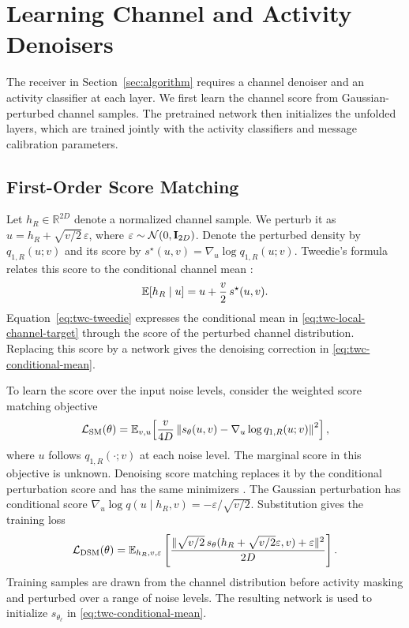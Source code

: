 \section{Learning Channel and Activity Denoisers}
\label{sec:learning}

The receiver in Section~\ref{sec:algorithm} requires a channel denoiser
and an activity classifier at each layer. We first learn the channel
score from Gaussian-perturbed channel samples. The pretrained network
then initializes the unfolded layers, which are trained jointly with
the activity classifiers and message calibration parameters.

\subsection{First-Order Score Matching}

Let $h_R\in\mathbb R^{2D}$ denote a normalized channel sample.
We perturb it as $u=h_R+\sqrt{v/2}\,\varepsilon$, where
$\varepsilon\sim\mathcal N(0,\mathbf{I}_{2D})$. Denote the perturbed
density by $q_{1,R}(u;v)$ and its score by
$s^\star(u,v)=\nabla_u\log q_{1,R}(u;v)$.
Tweedie's formula relates this score to the conditional channel mean
\cite{efron2011,cai2026}:
\begin{equation}
 \mathbb{E}[h_R\mid u]=u+\frac v2\,s^\star(u,v).
 \label{eq:twc-tweedie}
\end{equation}
Equation~\eqref{eq:twc-tweedie} expresses the conditional mean in
\eqref{eq:twc-local-channel-target} through the score of the perturbed
channel distribution. Replacing this score by a network gives the
denoising correction in \eqref{eq:twc-conditional-mean}.

To learn the score over the input noise levels, consider the
weighted score matching objective \cite[eqs.~(46)--(49)]{cai2026}
\begin{equation}
 \mathcal L_{\rm SM}(\theta)
 =\mathbb{E}_{v,u}\!\left[
 \frac{v}{4D}\left\|s_\theta(u,v)
       -\nabla_u\log q_{1,R}(u;v)\right\|^2\right],
 \label{eq:twc-score-matching}
\end{equation}
where $u$ follows $q_{1,R}(\cdot;v)$ at each noise level.
The marginal score in this objective is unknown. Denoising score
matching replaces it by the conditional perturbation score and has
the same minimizers \cite{vincent2011,song2019}.
The Gaussian perturbation has conditional score
$\nabla_u\log q(u\mid h_R,v)=-\varepsilon/\sqrt{v/2}$.
Substitution gives the training loss
\begin{equation}
 \mathcal L_{\rm DSM}(\theta)=\mathbb{E}_{h_R,v,\varepsilon}
 \left[\frac{\|\sqrt{v/2}\,s_\theta(h_R+\sqrt{v/2}\varepsilon,v)
                      +\varepsilon\|^2}{2D}\right].
 \label{eq:twc-dsm}
\end{equation}
Training samples are drawn from the channel distribution before
activity masking and perturbed over a range of noise levels.
The resulting network is used to initialize
$s_{\theta_\ell}$ in \eqref{eq:twc-conditional-mean}.

